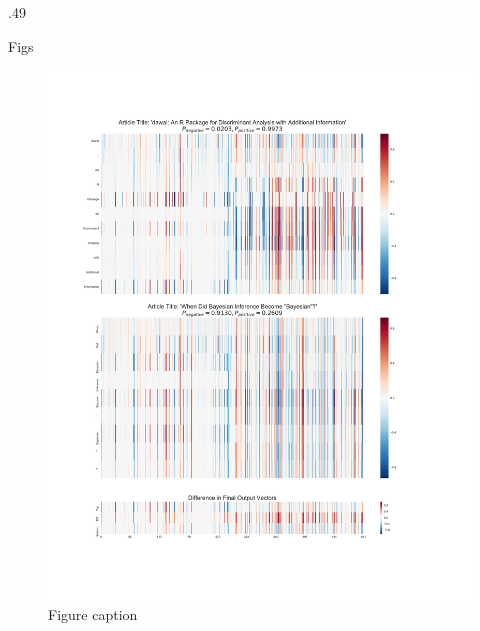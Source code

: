 \documentclass[final]{beamer}
\newlength{\onecolwid}
\begin{document}
\begin{frame}{}
\begin{columns}[t]
\begin{column}{\onecolwid}
\begin{columns}[t,totalwidth=\onecolwid]
	\begin{column}{.49\onecolwid}\vspace{-.6in} %
		\begin{block}{Figs}
			\begin{figure}
				\includegraphics[width=0.49\onecolwid]{comparisonTitle.pdf}
				\caption{Figure caption}
			\end{figure}
		\end{block}
		
	\end{column} 
	
\end{columns}

\end{column} 



\end{columns}
\end{frame}
\end{document}
